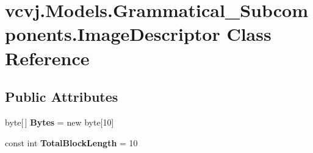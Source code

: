 \hypertarget{classvcvj_1_1_models_1_1_grammatical___subcomponents_1_1_image_descriptor}{}\section{vcvj.\+Models.\+Grammatical\+\_\+\+Subcomponents.\+Image\+Descriptor Class Reference}
\label{classvcvj_1_1_models_1_1_grammatical___subcomponents_1_1_image_descriptor}
\subsection*{Public Attributes}
\begin{DoxyCompactItemize}
\item 
byte\mbox{[}$\,$\mbox{]} {\bfseries Bytes} = new byte\mbox{[}10\mbox{]}\hypertarget{classvcvj_1_1_models_1_1_grammatical___subcomponents_1_1_image_descriptor_a72aee5acd4f3fce5e8ac56374f5ce063}{}\label{classvcvj_1_1_models_1_1_grammatical___subcomponents_1_1_image_descriptor_a72aee5acd4f3fce5e8ac56374f5ce063}

\item 
const int {\bfseries Total\+Block\+Length} = 10\hypertarget{classvcvj_1_1_models_1_1_grammatical___subcomponents_1_1_image_descriptor_a44c2202e96aba57941bb233ef3e155e9}{}\label{classvcvj_1_1_models_1_1_grammatical___subcomponents_1_1_image_descriptor_a44c2202e96aba57941bb233ef3e155e9}

\end{DoxyCompactItemize}
